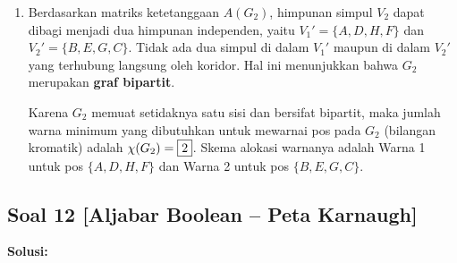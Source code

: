 \documentclass[12pt,a4paper]{article}
\begin{document}
\begin{enumerate}[label=(\alph*)]
    \item Berdasarkan matriks ketetanggaan $A(G_2)$, himpunan simpul $V_2$ dapat dibagi menjadi dua himpunan independen, yaitu $V_1' = \{A, D, H, F\}$ dan $V_2' = \{B, E, G, C\}$. Tidak ada dua simpul di dalam $V_1'$ maupun di dalam $V_2'$ yang terhubung langsung oleh koridor. Hal ini menunjukkan bahwa $G_2$ merupakan \textbf{graf bipartit}. 
    
    Karena $G_2$ memuat setidaknya satu sisi dan bersifat bipartit, maka jumlah warna minimum yang dibutuhkan untuk mewarnai pos pada $G_2$ (bilangan kromatik) adalah $\chi(G_2) = \fbox{2}$. Skema alokasi warnanya adalah Warna 1 untuk pos $\{A, D, H, F\}$ dan Warna 2 untuk pos $\{B, E, G, C\}$.
\end{enumerate}

\newpage
\subsection*{Soal 12 [Aljabar Boolean -- Peta Karnaugh]}
\textbf{Solusi:}
\end{document}
